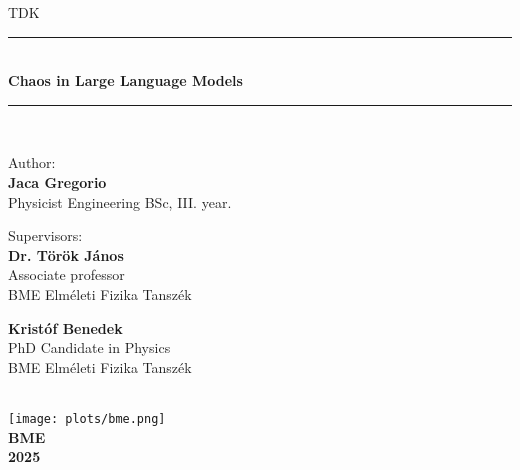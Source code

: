 \documentclass[a4paper,12pt]{article}
\begin{document}
\begin{titlepage}
\newcommand{\HRule}{\rule{\linewidth}{0.5mm}}
\center
\huge\textsc{TDK}
\HRule \\[0.4cm]
{ \huge \bfseries Chaos in Large Language Models}\\[0.2cm] 
\HRule \\[0.5cm]
\begin{minipage}[t]{0.4\textwidth}
\begin{flushleft} \large
Author: \\
\Large\textbf{Jaca Gregorio}\\
\large{Physicist Engineering BSc, III. year.}
\end{flushleft}
\end{minipage}
\qquad
\begin{minipage}[t]{0.4\textwidth}
\begin{flushleft}\large
Supervisors: \\
\Large\textbf{Dr. Török János}\\
\large Associate professor \\
BME Elméleti Fizika Tanszék

\Large\textbf{Kristóf Benedek}\\
\large PhD Candidate in Physics \\
BME Elméleti Fizika Tanszék

\end{flushleft}
\end{minipage}
\\[6cm]
\texttt{[image: plots/bme.png]}\\[0.2cm]
\large{\textbf{BME}}\\
\large{\textbf{2025}}
\vfill
\end{titlepage}


\end{document}
